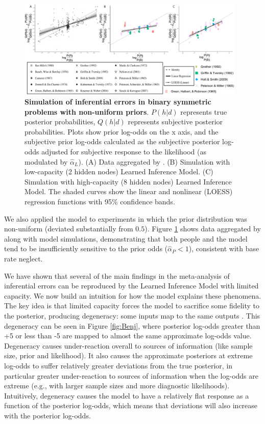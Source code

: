 

\begin{figure}
\centering
      \includegraphics[width=0.97\textwidth]{figures/Benjamin_prior.pdf}
  \caption{\textbf{Simulation of inferential errors in binary symmetric problems with non-uniform priors}. $P(h | d)$ represents true posterior probabilities, $Q(h | d)$ represents subjective posterior probabilities. Plots show prior log-odds on the x axis, and the subjective prior log-odds calculated as the subjective posterior log-odds adjusted for subjective response to the likelihood (as modulated by $\hat{\alpha}_L$). (A) Data aggregated by \cite{benjamin18}. (B) Simulation with low-capacity (2 hidden nodes) Learned Inference Model. (C) Simulation with high-capacity (8 hidden nodes) Learned Inference Model. The shaded curves show the linear and nonlinear (LOESS) regression functions with 95\% confidence bands.} 
  \label{fig:Benj_prior}
\end{figure}

We also applied the model to experiments in which the prior distribution was non-uniform (deviated substantially from $0.5$). Figure \ref{fig:Benj_prior} shows data aggregated by \citet{benjamin18} along with model simulations, demonstrating that both people and the model tend to be insufficiently sensitive to the prior odds ($\hat{\alpha}_P < 1$), consistent with base rate neglect.

We have shown that several of the main findings in the \citet{benjamin18} meta-analysis of inferential errors can be reproduced by the Learned Inference Model with limited capacity. We now build an intuition for how the model explains these phenomena. The key idea is that limited capacity forces the model to sacrifice some fidelity to the posterior, producing degeneracy: some inputs map to the same outputs \citep[see][for a similar argument]{massey2005detecting}. This degeneracy can be seen in Figure \ref{fig:Benj}, where posterior log-odds greater than +5 or less than -5 are mapped to almost the same approximate log-odds value. Degeneracy causes under-reaction overall to sources of information (like sample size, prior and likelihood). It also causes the approximate posteriors at extreme log-odds to suffer relatively greater deviations from the true posterior, in particular greater under-reaction to sources of information when the log-odds are extreme (e.g., with larger sample sizes and more diagnostic likelihoods). Intuitively, degeneracy causes the model to have a relatively flat response as a function of the posterior log-odds, which means that deviations will also increase with the posterior log-odds.

